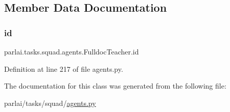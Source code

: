 \subsection{Member Data Documentation}
\mbox{\label{classparlai_1_1tasks_1_1squad_1_1agents_1_1FulldocTeacher_a3fca2b49bb7fffc80462c30b700a6168}} 
\subsubsection{\texorpdfstring{id}{id}}
{\footnotesize\ttfamily parlai.\+tasks.\+squad.\+agents.\+Fulldoc\+Teacher.\+id}



Definition at line 217 of file agents.\+py.



The documentation for this class was generated from the following file\+:\begin{DoxyCompactItemize}
\item 
parlai/tasks/squad/\hyperlink{parlai_2tasks_2squad_2agents_8py}{agents.\+py}\end{DoxyCompactItemize}
